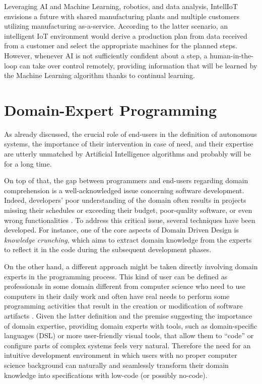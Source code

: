 \begin{itemize}
    Leveraging AI and Machine Learning, robotics, and data analysis, IntellIoT envisions a future with shared manufacturing plants and multiple customers utilizing manufacturing as-a-service.
    According to the latter scenario, an intelligent IoT environment would derive a production plan from data received from a customer and select the appropriate machines for the planned steps.
    However, whenever AI is not sufficiently confident about a step, a human-in-the-loop can take over control remotely, providing information that will be learned by the Machine Learning algorithm thanks to continual learning.
\end{itemize}

\section{Domain-Expert Programming}
As already discussed, the crucial role of end-users in the definition of autonomous systems, the importance of their intervention in case of need, and their expertise are utterly unmatched by Artificial Intelligence algorithms and probably will be for a long time.

On top of that, the gap between programmers and end-users regarding domain comprehension is a well-acknowledged issue concerning software development.
Indeed, developers' poor understanding of the domain often results in projects missing their schedules or exceeding their budget, poor-quality software, or even wrong functionalities \cite{5089292}.
To address this critical issue, several techniques have been developed.
For instance, one of the core aspects of Domain Driven Design is \textit{knowledge crunching}, which aims to extract domain knowledge from the experts to reflect it in the code during the subsequent development phases.

On the other hand, a different approach might be taken directly involving domain experts in the programming process.
This kind of user can be defined as professionals in some domain different from computer science who need to use computers in their daily work and often have real needs to perform some programming activities that result in the creation or modification of software artifacts \cite{costabile2003domain}.
Given the latter definition and the premise suggesting the importance of domain expertise, providing domain experts with tools, such as domain-specific languages (DSL) or more user-friendly visual tools, that allow them to ``code'' or configure parts of complex systems feels very natural.
Therefore the need for an intuitive development environment in which users with no proper computer science background can naturally and seamlessly transform their domain knowledge into specifications with low-code (or possibly no-code).

